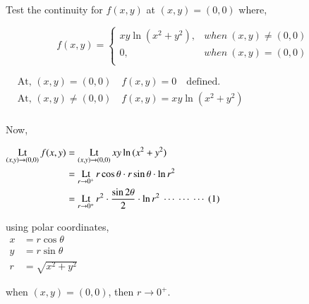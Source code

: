 \documentclass[12pt]{article}
\begin{document}
\vspace{3ex}
\textbf{} Test the continuity for $f(x,y)$ at $(x,y)=(0,0)$ where,

\vspace{-0.5\baselineskip}
\begin{equation*}
   f(x,y) =
   \begin{cases}
      xy \ln{(x^2+y^2)}, & when \ (x,y) \neq (0,0)\\
           0, & when \ (x,y) = (0,0)\\
   \end{cases}
\end{equation*}

\vspace{-\baselineskip}

\vspace{1ex}
$\begin{aligned}
   &\text{At,\ } (x,y) = (0,0) \quad f(x,y)=0 \quad \text{defined.}\\
   &\text{At,\ } (x,y) \neq (0,0) \quad f(x,y)=xy \ln{(x^2+y^2)}\\
\end{aligned}$

\vspace{2ex}
Now,\\
\begin{minipage}[t]{0.6\linewidth}
\noindent
$\begin{aligned}
   \Lt f(x, y) & = \Lt xy \ln{(x^2+y^2)} \\
   & =\Lt[0^+][r] r\cos{\theta} \cdot r\sin{\theta} \cdot \ln{r^2} \\
   & =\Lt[0^+][r] r^2 \cdot \frac{\sin{2\theta}}{2} \cdot \ln{r^2} \seteqno{1} \\
\end{aligned}$
\end{minipage}\hspace{0.5ex}{\vrule width 1pt}\hspace{0.5ex}
\begin{minipage}[t]{0.38\linewidth}
   \vspace{-2\baselineskip}
   using polar coordinates,\\
   $\begin{aligned}
      x &= r\cos{\theta}\\[-1ex]
      y &= r\sin{\theta}\\[-1ex]
      r &= \sqrt{x^2+y^2}
   \end{aligned}$

   \vspace{1ex}
   when $(x,y) = (0,0)$, then $r \to 0^+$.
\end{minipage}
\end{document}
